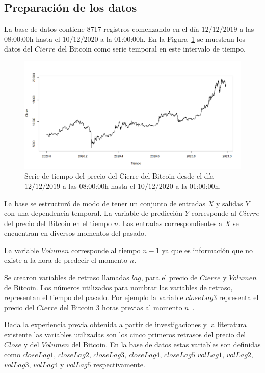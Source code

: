 \documentclass[a4paper,12pt,twocolumn]{article}
\begin{document}
\subsection{Preparación de los datos}

La base de datos contiene 8717 registros comenzando en el día $12/12/2019$ a las 08:00:00h hasta el $10/12/2020$ a la 01:00:00h. En la Figura~\ref{priceClose} se muestran los datos del $Cierre$ del Bitcoin como serie temporal en este intervalo de tiempo. 

\begin{figure}[!hbt]
\centering
\includegraphics[width=1\textwidth]{serie}
\caption{Serie de tiempo del precio del Cierre del Bitcoin desde el día $12/12/2019$ a las 08:00:00h hasta el $10/12/2020$ a la 01:00:00h.}
\label{priceClose}
\end{figure}


La base se estructuró de modo de tener un conjunto de entradas $X$ y salidas $Y$ con una dependencia temporal. La variable de predicción $Y$ corresponde al $Cierre$ del precio del Bitcoin en el tiempo $n$. Las entradas correspondientes a $X$ se encuentran en diversos momentos del pasado. 

La variable $Volumen$ corresponde al tiempo $n-1$ ya que es información que no existe a la hora de predecir el momento $n$.

Se crearon variables  de retraso llamadas $lag$, para el precio de $Cierre$ y $Volumen$ de Bitcoin. Los números utilizados para nombrar las variables de retraso, representan el tiempo del pasado. Por ejemplo la variable $closeLag3$ representa el precio del $Cierre$ del Bitcoin 3 horas previas al momento $n$~\cite{forecastinBitcoinClosing}.  

Dada la experiencia previa obtenida a partir de investigaciones y la literatura existente las variables utilizadas son los cinco primeros retrasos del precio del $Close$ y del $Volumen$ del Bitcoin. En la base de datos estas variables son definidas como $closeLag1$, $closeLag2$, $closeLag3$, $closeLag4$, $closeLag5$ $volLag1$, $volLag2$, $volLag3$, $volLag4$ y $volLag5$ respectivamente.
\end{document}
